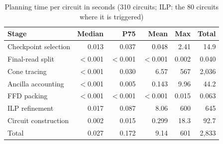 \begin{table}[!t]
\caption{Planning time per circuit in seconds (310 circuits; ILP: the 80 circuits where it is triggered)}
\label{tab:planning}
\centering
\footnotesize
\begin{tabular}{lrrrrr}
\hline
Stage & Median & P75 & Mean & Max & Total \\
\hline
Checkpoint selection & 0.013 & 0.037 & 0.048 & 2.41 & 14.9 \\
Final-read split & $<$0.001 & $<$0.001 & $<$0.001 & 0.002 & 0.040 \\
Cone tracing & $<$0.001 & 0.030 & 6.57 & 567 & 2,036 \\
Ancilla accounting & $<$0.001 & 0.005 & 0.143 & 9.96 & 44.2 \\
FFD packing & $<$0.001 & $<$0.001 & $<$0.001 & 0.015 & 0.063 \\
ILP refinement & 0.017 & 0.087 & 8.06 & 600 & 645 \\
Circuit construction & 0.002 & 0.015 & 0.299 & 18.3 & 92.7 \\
\hline
Total & 0.027 & 0.172 & 9.14 & 601 & 2,833 \\
\hline
\end{tabular}
\end{table}
